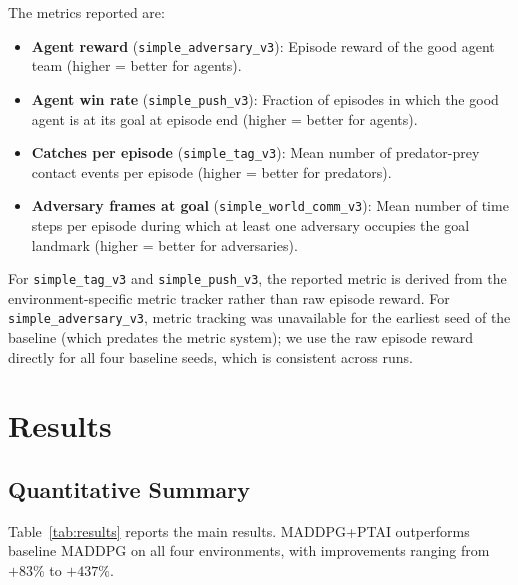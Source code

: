 \documentclass[12pt]{article}
\begin{document}
The metrics reported are:
\begin{itemize}
  \item \textbf{Agent reward} (\texttt{simple\_adversary\_v3}): Episode reward of the
        good agent team (higher = better for agents).
  \item \textbf{Agent win rate} (\texttt{simple\_push\_v3}): Fraction of episodes in
        which the good agent is at its goal at episode end (higher = better for agents).
  \item \textbf{Catches per episode} (\texttt{simple\_tag\_v3}): Mean number of
        predator-prey contact events per episode (higher = better for predators).
  \item \textbf{Adversary frames at goal} (\texttt{simple\_world\_comm\_v3}): Mean
        number of time steps per episode during which at least one adversary occupies the
        goal landmark (higher = better for adversaries).
\end{itemize}

For \texttt{simple\_tag\_v3} and \texttt{simple\_push\_v3}, the reported metric is
derived from the environment-specific metric tracker rather than raw episode reward.
For \texttt{simple\_adversary\_v3}, metric tracking was unavailable for the earliest seed
of the baseline (which predates the metric system); we use the raw episode reward directly
for all four baseline seeds, which is consistent across runs.

\section{Results}

\subsection{Quantitative Summary}

Table~\ref{tab:results} reports the main results. MADDPG+PTAI outperforms baseline MADDPG
on all four environments, with improvements ranging from $+83\%$ to $+437\%$.
\end{document}

